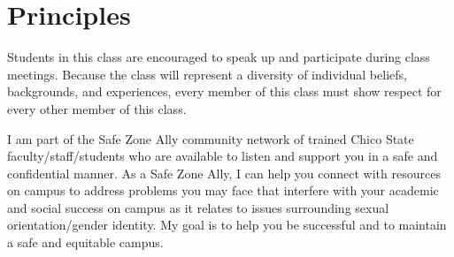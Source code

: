 \documentclass[12pt]{article}
\begin{document}
  \section*{Principles}
  \noindent
  Students in this class are encouraged to speak up and participate during class meetings. Because the class will represent a diversity of individual beliefs, backgrounds, and experiences, every member of this class must show respect for every other member of this class.
  \par
  I am part of the Safe Zone Ally community network of trained Chico State faculty/staff/students who are available to listen and support you in a safe and confidential manner. As a Safe Zone Ally, I can help you connect with resources on campus to address problems you may face that interfere with your academic and social success on campus as it relates to issues surrounding sexual orientation/gender identity. My goal is to help you be successful and to maintain a safe and equitable campus.
\end{document}
